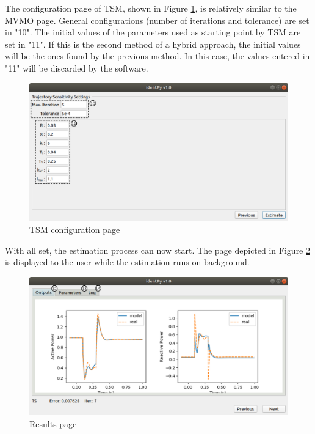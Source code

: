 The configuration page of TSM, shown in Figure \ref{fig: TS_page}, is relatively similar to the MVMO page. General configurations (number of iterations and tolerance) are set in "10". The initial values of the parameters used as starting point by TSM are set in "11". If this is the second method of a hybrid approach, the initial values will be the ones found by the previous method. In this case, the values entered in "11" will be discarded by the software.

\begin{figure}[!h]
	\caption{TSM configuration page}
	\begin{center}
		\includegraphics[scale=.5]{Images/Software_TS_page.eps}
	\end{center}
	\label{fig: TS_page}
\end{figure}

With all set, the estimation process can now start. The page depicted in Figure \ref{fig: final_pg} is displayed to the user while the estimation runs on background.

\begin{figure}[h]
	\caption{Results page}
	\begin{center}
		\includegraphics[scale=.5]{Images/Software_results_page.eps}
	\end{center}
	\label{fig: final_pg}
\end{figure}

